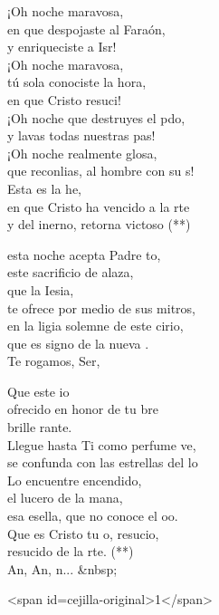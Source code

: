 \begin{cancion}
\begin{chorus}
	¡Oh noche maravosa,\\
en que despojaste al Faraón,\\
	y enriqueciste a Isr!\\
	¡Oh noche maravosa,\\
tú sola conociste la hora,\\
	en que Cristo resuci!\\
	¡Oh noche que destruyes el pdo,\\
	y lavas todas nuestras pas!\\
	¡Oh noche realmente glosa,\\
	que reconlias, al hombre con su s!\\
	Esta es la he,\\
	en que Cristo ha vencido a la rte\\
	y del inerno, retorna victoso (**)\\
	\end{chorus}%
	esta noche acepta Padre to,\\
	este sacrificio de alaza,\\
	que la Iesia,\\
	te ofrece por medio de sus mitros,\\
	en la ligia solemne de este cirio,\\
	que es signo de la nueva .\\
	Te rogamos, Ser,\\
	\begin{chorus}%
	Que este io\\
	ofrecido en honor de tu bre\\
	brille rante.\\
	Llegue hasta Ti como perfume ve,\\
	se confunda con las estrellas del lo\\
Lo encuentre encendido,\\
	el lucero de la mana,\\
	esa esella, que no conoce el oo.\\
	Que es Cristo tu o, resucio,\\
	resucido de la rte. (**)\\
	An, An, n... &nbsp; \\
	\end{chorus}%
<span id=cejilla-original>1</span>\\
\end{cancion}%
